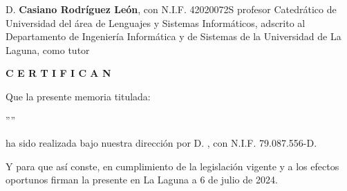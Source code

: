 \newpage
\thispagestyle{empty}

D. {\bf Casiano Rodríguez León}, con N.I.F. 42020072S profesor Catedrático de Universidad 
del área de Lenguajes y Sistemas Informáticos,
adscrito al Departamento de Ingeniería Informática y de Sistemas de la Universidad de La Laguna, como tutor



\pagestyle{empty}

\bigskip
\bigskip
{\bf C E R T I F I C A N}

\bigskip
\bigskip
Que la presente memoria titulada:

\bigskip
''{\it \tfgTitle}''

\bigskip
\bigskip
\bigskip

\noindent ha sido realizada bajo nuestra dirección por D. {\bf \tfgStudentName},
con N.I.F. 79.087.556-D.

\bigskip
\bigskip

Y para que así conste, en cumplimiento de la legislación vigente y a los efectos
oportunos firman la presente en La Laguna a 6 de julio de 2024.
